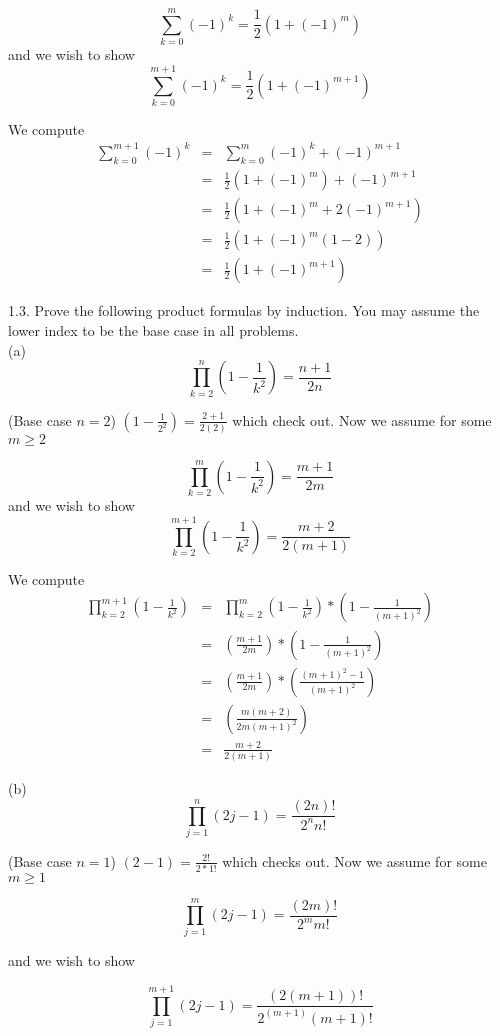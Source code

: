\documentclass[16 pt]{amsart}
\theoremstyle{definition}
\theoremstyle{remark}
\numberwithin{equation}{subsection}
\begin{document}
\[
\sum_{k=0}^m (-1)^k = \frac{1}{2}(1+(-1)^m)
\]
 and we wish to show
 \[
 \sum_{k=0}^{m+1} (-1)^k = \frac{1}{2}(1+(-1)^{m+1})
 \]

We compute
\begin{eqnarray}
 \sum_{k=0}^{m+1} (-1)^k & = &  \sum_{k=0}^{m} (-1)^k + (-1)^{m+1}\nonumber \\
 & = & \frac{1}{2}(1+(-1)^m) + (-1)^{m+1}\nonumber \\
 & = & \frac{1}{2}(1+(-1)^m + 2(-1)^{m+1}) \nonumber \\
 & = & \frac{1}{2}(1 + (-1)^m(1-2))\nonumber\\
 & = & \frac{1}{2}(1+(-1)^{m+1})\nonumber
\end{eqnarray}

1.3. Prove the following product formulas by induction.  You may assume the lower index to be the base case in all problems.\\

(a) 
\[
\prod_{k=2}^{n} \left(1 - \frac{1}{k^2}\right) = \frac{n+1}{2n}
\]

(Base case $n=2$) $\left(1 - \frac{1}{2^2}\right) = \frac{2+1}{2(2)}$ which check out. Now we assume for some $m\ge2$

\[
\prod_{k=2}^{m} \left(1 - \frac{1}{k^2}\right) = \frac{m+1}{2m}
\]
and we wish to show
\[
\prod_{k=2}^{m+1} \left(1 - \frac{1}{k^2}\right) = \frac{m+2}{2(m+1)}
\]

We compute
\begin{eqnarray}
\prod_{k=2}^{m+1} \left(1 - \frac{1}{k^2}\right) & = & \prod_{k=2}^{m} \left(1 - \frac{1}{k^2}\right)*\left(1 - \frac{1}{(m+1)^2}\right) \nonumber \\
& = & \left(\frac{m+1}{2m}\right)*\left(1 - \frac{1}{(m+1)^2}\right)\nonumber \\
& = & \left(\frac{m+1}{2m}\right)*\left(\frac{(m+1)^2-1}{(m+1)^2}\right)\nonumber\\
& = & \left(\frac{m(m+2)}{2m(m+1)^2}\right)\nonumber \\
& = & \frac{m+2}{2(m+1)} \nonumber
\end{eqnarray}


(b) 
\[
\prod_{j=1}^{n} (2j-1) = \frac{(2n)!}{2^n n!}
\]

(Base case $n=1$) $(2-1) = \frac{2!}{2 * 1!}$ which checks out.  Now we assume for some $m\ge 1$

\[
\prod_{j=1}^{m} (2j-1) = \frac{(2m)!}{2^m m!}
\]

and we wish to show

\[
\prod_{j=1}^{m+1} (2j-1) = \frac{(2(m+1))!}{2^(m+1) (m+1)!}
\]
\end{document}
